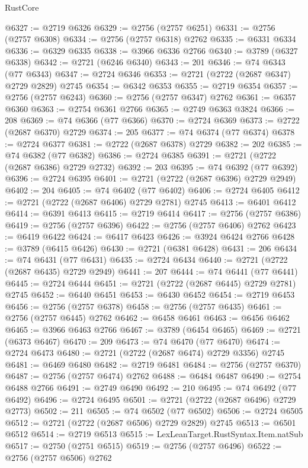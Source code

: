 \begin{lexlean}{RustCore}
\begin{coremodule}
@6327 := @2719 @6326
@6329 := @2756 (@2757 @6251)
@6331 := @2756 (@2757 @6308)
@6334 := @2756 (@2757 @6318) @2762
@6335 := @6331 @6334
@6336 := @6329 @6335
@6338 := @3966 @6336 @2766
@6340 := @3789 (@6327 @6338)
@6342 := @2721 (@6246 @6340)
@6343 := 201
@6346 := @74 @6343 (@77 @6343)
@6347 := @2724 @6346
@6353 := @2721 (@2722 (@2687 @6347) @2729 @2829) @2745
@6354 := @6342 @6353
@6355 := @2719 @6354
@6357 := @2756 (@2757 @6243)
@6360 := @2756 (@2757 @6347) @2762
@6361 := @6357 @6360
@6363 := @2754 @6361 @2766
@6365 := @2749 @6363 @3824
@6366 := 208
@6369 := @74 @6366 (@77 @6366)
@6370 := @2724 @6369
@6373 := @2722 (@2687 @6370) @2729
@6374 := 205
@6377 := @74 @6374 (@77 @6374)
@6378 := @2724 @6377
@6381 := @2722 (@2687 @6378) @2729
@6382 := 202
@6385 := @74 @6382 (@77 @6382)
@6386 := @2724 @6385
@6391 := @2721 (@2722 (@2687 @6386) @2729 @2732)
@6392 := 203
@6395 := @74 @6392 (@77 @6392)
@6396 := @2724 @6395
@6401 := @2721 (@2722 (@2687 @6396) @2729 @2949)
@6402 := 204
@6405 := @74 @6402 (@77 @6402)
@6406 := @2724 @6405
@6412 := @2721 (@2722 (@2687 @6406) @2729 @2781) @2745
@6413 := @6401 @6412
@6414 := @6391 @6413
@6415 := @2719 @6414
@6417 := @2756 (@2757 @6386)
@6419 := @2756 (@2757 @6396)
@6422 := @2756 (@2757 @6406) @2762
@6423 := @6419 @6422
@6424 := @6417 @6423
@6426 := @3924 @6424 @2766
@6428 := @3789 (@6415 @6426)
@6430 := @2721 (@6381 @6428)
@6431 := 206
@6434 := @74 @6431 (@77 @6431)
@6435 := @2724 @6434
@6440 := @2721 (@2722 (@2687 @6435) @2729 @2949)
@6441 := 207
@6444 := @74 @6441 (@77 @6441)
@6445 := @2724 @6444
@6451 := @2721 (@2722 (@2687 @6445) @2729 @2781) @2745
@6452 := @6440 @6451
@6453 := @6430 @6452
@6454 := @2719 @6453
@6456 := @2756 (@2757 @6378)
@6458 := @2756 (@2757 @6435)
@6461 := @2756 (@2757 @6445) @2762
@6462 := @6458 @6461
@6463 := @6456 @6462
@6465 := @3966 @6463 @2766
@6467 := @3789 (@6454 @6465)
@6469 := @2721 (@6373 @6467)
@6470 := 209
@6473 := @74 @6470 (@77 @6470)
@6474 := @2724 @6473
@6480 := @2721 (@2722 (@2687 @6474) @2729 @3356) @2745
@6481 := @6469 @6480
@6482 := @2719 @6481
@6484 := @2756 (@2757 @6370)
@6487 := @2756 (@2757 @6474) @2762
@6488 := @6484 @6487
@6490 := @2754 @6488 @2766
@6491 := @2749 @6490
@6492 := 210
@6495 := @74 @6492 (@77 @6492)
@6496 := @2724 @6495
@6501 := @2721 (@2722 (@2687 @6496) @2729 @2773)
@6502 := 211
@6505 := @74 @6502 (@77 @6502)
@6506 := @2724 @6505
@6512 := @2721 (@2722 (@2687 @6506) @2729 @2829) @2745
@6513 := @6501 @6512
@6514 := @2719 @6513
@6515 := LexLeanTarget.RustSyntax.Item.natSub
@6517 := @2750 (@2751 @6515)
@6519 := @2756 (@2757 @6496)
@6522 := @2756 (@2757 @6506) @2762

\end{coremodule}
\end{lexlean}
